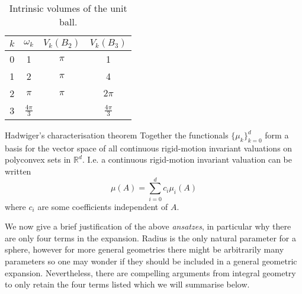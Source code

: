 \begin{SCtable}
  \begin{minipage}[b]{\linewidth}
    \centering
    \begin{tabular}{cccc}
      \toprule
      $k$ & $\omega_k$ & $V_k(B_2)$ & $V_k(B_3)$ \\
      \midrule
      0 & 1 & $\pi$ & 1 \\
      1 & 2 & $\pi$ & 4\\
      2 & $\pi$ & $\pi$ & $2\pi$\\
      3 & $\frac{4\pi}{3}$ && $\frac{4\pi}{3}$ \\
      \bottomrule
    \end{tabular}
  \end{minipage}
  \caption{Intrinsic volumes of the unit ball.}
\end{SCtable}

\begin{theorem}{Hadwiger's characterisation theorem}
  Together the functionals $\{\mu_k\}_{k=0}^d$ form a basis for the vector space of all continuous rigid-motion invariant valuations on polyconvex sets in $\mathbb{R}^d$.
I.e. a continuous rigid-motion invariant valuation can be written
\begin{equation}
  \mu(A) = \sum_{i=0}^d c_i \mu_i(A)
\end{equation}
where $c_i$ are some coefficients independent of $A$.
\end{theorem}

We now give a brief justification of the above \emph{ansatzes}, in particular why there are only four terms in the expansion.
Radius is the only natural parameter for a sphere, however for more general geometries there might be arbitrarily many parameters so one may wonder if they should be included in a general geometric expansion.
Nevertheless, there are compelling arguments from integral geometry \cite{KonigPRL2004} to only retain the four terms listed which we will summarise below.

